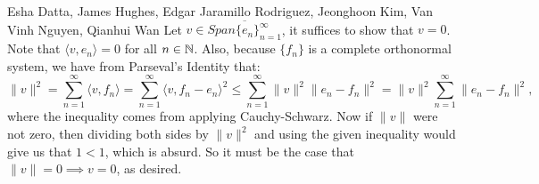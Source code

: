 

\begin{solution}{Esha Datta, James Hughes, Edgar Jaramillo Rodriguez, Jeonghoon Kim, Van Vinh Nguyen, Qianhui Wan}
        Let $v \in \overline{Span \{e_n\}_{n=1}^\infty}$, it suffices to show that $v =0$.
        Note that $\langle v, e_n \rangle = 0$ for all $n\in \mathbb{N}$.
        Also, because $\{f_n\}$ is a complete orthonormal system, we have from Parseval's Identity that:
        \begin{equation*}
                \lVert v \rVert^2 = \sum_{n=1}^\infty \langle v,f_n \rangle = \sum_{n=1}^\infty \langle v,f_n-e_n \rangle^2
                \leq \sum_{n=1}^\infty \lVert v \rVert^2 \lVert e_n-f_n \rVert^2 
                =\lVert v \rVert^2  \sum_{n=1}^\infty \lVert e_n-f_n \rVert^2,
        \end{equation*}
        where the inequality comes from applying Cauchy-Schwarz.
        Now if $\lVert v \rVert$ were not zero, then dividing both sides by $\lVert v \rVert^2$ and using the given inequality would give us that $1< 1$, which is absurd.
        So it must be the case that $\lVert v \rVert= 0 \implies v=0$, as desired.
\end{solution}

